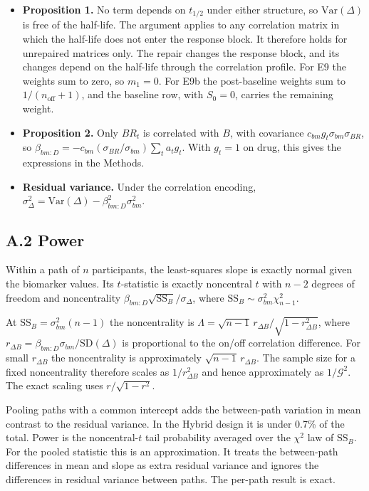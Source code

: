 \documentclass[
  11pt,
]{article}
\providecommand{\tightlist}{%
  \setlength{\itemsep}{0pt}\setlength{\parskip}{0pt}}
\begin{document}
\begin{itemize}
\tightlist
\item
  \textbf{Proposition 1.} No term depends on \(t_{1/2}\) under either
  structure, so \(\mathrm{Var}(\Delta)\) is free of the half-life. The
  argument applies to any correlation matrix in which the half-life
  does not enter the response block. It therefore holds for unrepaired
  matrices only. The repair changes the response block, and its
  changes depend on the half-life through the correlation profile. For
  E9 the weights sum to zero, so \(m_1 = 0\). For E9b the post-baseline
  weights sum to \(1/(n_{\text{off}} + 1)\), and the baseline row, with
  \(S_0 = 0\), carries the remaining weight.
\item
  \textbf{Proposition 2.} Only \(BR_t\) is correlated with \(B\), with covariance
  \(c_{bm} g_t\sigma_{bm}\sigma_{BR}\), so
  \(\beta_{bm:D} = -c_{bm}(\sigma_{BR}/\sigma_{bm})\sum_t a_t g_t\). With
  \(g_t = 1\) on drug, this gives the expressions in the Methods.
\item
  \textbf{Residual variance.} Under the correlation encoding,
  \(\sigma_\Delta^2 = \mathrm{Var}(\Delta) - \beta_{bm:D}^2\sigma_{bm}^2\).
\end{itemize}

\subsection*{A.2 Power}\label{a.2-power}

Within a path of \(n\) participants, the least-squares slope is exactly
normal given the biomarker values. Its \(t\)-statistic is exactly
noncentral \(t\) with \(n - 2\) degrees of freedom and noncentrality
\(\beta_{bm:D}\sqrt{\mathrm{SS}_B}/\sigma_\Delta\), where
\(\mathrm{SS}_B \sim \sigma_{bm}^2\chi^2_{n-1}\).

At \(\mathrm{SS}_B = \sigma_{bm}^2(n - 1)\) the noncentrality is
\(\Lambda = \sqrt{n - 1}\,r_{\Delta B}/\sqrt{1 - r_{\Delta B}^2}\),
where \(r_{\Delta B} = \beta_{bm:D}\sigma_{bm}/\mathrm{SD}(\Delta)\) is
proportional to the on/off correlation difference. For small
\(r_{\Delta B}\) the noncentrality is approximately
\(\sqrt{n - 1}\,r_{\Delta B}\). The sample size for a fixed
noncentrality therefore scales as \(1/r_{\Delta B}^2\) and hence
approximately as \(1/\mathcal G^2\). The exact scaling uses
\(r/\sqrt{1 - r^2}\).

Pooling paths with a common intercept adds the between-path variation
in mean contrast to the residual variance. In the Hybrid design it is
under 0.7\% of the total. Power is the noncentral-\(t\) tail probability
averaged over the \(\chi^2\) law of \(\mathrm{SS}_B\). For the pooled
statistic this is an approximation. It treats the between-path
differences in mean and slope as extra residual variance and ignores
the differences in residual variance between paths. The per-path
result is exact.
\end{document}
